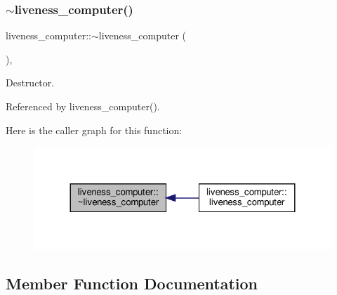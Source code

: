 \subsubsection{\texorpdfstring{$\sim$liveness\+\_\+computer()}{~liveness\_computer()}}
{\footnotesize\ttfamily liveness\+\_\+computer\+::$\sim$liveness\+\_\+computer (\begin{DoxyParamCaption}{ }\end{DoxyParamCaption})\hspace{0.3cm}{\ttfamily [override]}, {\ttfamily [default]}}



Destructor. 



Referenced by liveness\+\_\+computer().

Here is the caller graph for this function\+:
\nopagebreak
\begin{figure}[H]
\begin{center}
\leavevmode
\includegraphics[width=324pt]{dc/dc6/classliveness__computer_a9773b9fa9cea6b46dc78a43fcffee8b3_icgraph}
\end{center}
\end{figure}


\subsection{Member Function Documentation}
\mbox{\label{classliveness__computer_a9b84eb26166083179eec5570e27e3d95}} 
